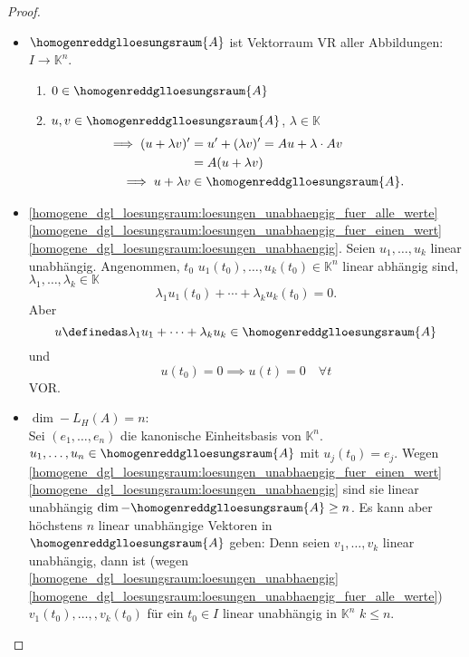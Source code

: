 \begin{proof}
  \begin{itemize}
    \item \( \homogenreddglloesungsraum{A} \) ist Vektorraum \tsubset VR aller Abbildungen: \( I\to \mathbb{K}^n \).
    \begin{enumerate}
      \item \( 0\in \homogenreddglloesungsraum{A} \) \checkmark
      \item \( u,v\in \homogenreddglloesungsraum{A} \), \( \lambda\in \mathbb{K} \)
      \begin{align*}
        \implies (u+\lambda v)'&=u'+(\lambda v)'=A u+\lambda\cdot A v\\
        &=A(u+\lambda v)\\
        \implies u+\lambda v&\in \homogenreddglloesungsraum{A}.
      \end{align*}
    \end{enumerate}
    \item \ref{homogene_dgl_loesungsraum:loesungen_unabhaengig_fuer_alle_werte} \timplies \ref{homogene_dgl_loesungsraum:loesungen_unabhaengig_fuer_einen_wert} \timplies \ref{homogene_dgl_loesungsraum:loesungen_unabhaengig}.
    \minisec{\ref{homogene_dgl_loesungsraum:loesungen_unabhaengig} \timplies \ref{homogene_dgl_loesungsraum:loesungen_unabhaengig_fuer_alle_werte}} Seien \( u_1,\dotsc, u_k \) linear unabhängig. Angenommen, \texists  \( t_0 \) \sd \( u_1(t_0),\dotsc,u_k(t_0)\in \mathbb{K}^n\) linear abhängig sind, \dh \texists  \( \lambda_1,\dotsc,\lambda_k\in \mathbb{K} \) \sd 
    \begin{equation*}
      \lambda_1 u_1(t_0)+\dotsb+\lambda_k u_k (t_0)=0.
    \end{equation*}
    Aber
    \begin{equation*}
      u\definedas \lambda_1 u_1+\dotsb+\lambda_k u_k \in \homogenreddglloesungsraum{A}
    \end{equation*}
    und
    \begin{equation*}
      u(t_0)=0\implies u(t)=0\quad \forall t
    \end{equation*}
    \contra VOR\@.
    \item \( \dim-{L_H(A)}=n \):\\
    Sei \( (e_1,\dotsc,e_n) \) die kanonische Einheitsbasis von \( \mathbb{K}^n \). \texists \( u_1,\dotsc,u_n\in \homogenreddglloesungsraum{A} \) mit \( u_j(t_0)=e_j \). Wegen \ref{homogene_dgl_loesungsraum:loesungen_unabhaengig_fuer_einen_wert} \timplies \ref{homogene_dgl_loesungsraum:loesungen_unabhaengig} sind sie linear unabhängig \timplies \( \dim-{\homogenreddglloesungsraum{A}}\geq n \). Es kann aber höchstens \( n \) linear unabhängige Vektoren in \( \homogenreddglloesungsraum{A} \) geben: Denn seien \( v_1,\dotsc,v_k \) linear unabhängig, dann ist (wegen \ref{homogene_dgl_loesungsraum:loesungen_unabhaengig} \timplies \ref{homogene_dgl_loesungsraum:loesungen_unabhaengig_fuer_alle_werte}) \( v_1(t_0),\dotsc,, v_k(t_0) \) für ein \( t_0\in I \) linear unabhängig in \( \mathbb{K}^n \) \timplies \( k\leq n \).
  \end{itemize}
\end{proof}
